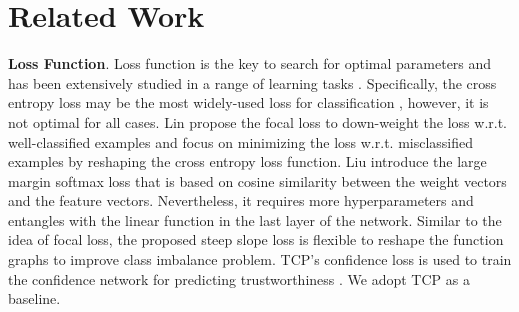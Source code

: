 \section{Related Work}

\noindent\textbf{Loss Function}. Loss function is the key to search for optimal parameters and has been extensively studied in a range of learning tasks \cite{Corbiere_NIPS_2019,Lin_ICCV_2017,Cox_JRSS_1972,Liu_ICML_2016}.
Specifically, the cross entropy loss may be the most widely-used loss for classification \cite{Cox_JRSS_1972}, however, it is not optimal for all cases. 
Lin \etal \cite{Lin_ICCV_2017} propose the focal loss to down-weight the loss w.r.t. well-classified examples and focus on minimizing the loss w.r.t. misclassified examples by reshaping the cross entropy loss function.
Liu \etal \cite{Liu_ICML_2016} introduce the large margin softmax loss that is based on cosine similarity between the weight vectors and the feature vectors.
Nevertheless, it requires more hyperparameters and entangles with the linear function in the last layer of the network.
Similar to the idea of focal loss, the proposed steep slope loss is flexible to reshape the function graphs to improve class imbalance problem.
TCP's confidence loss is used to train the confidence network for predicting trustworthiness \cite{Corbiere_NIPS_2019}.
We adopt TCP as a baseline. %

